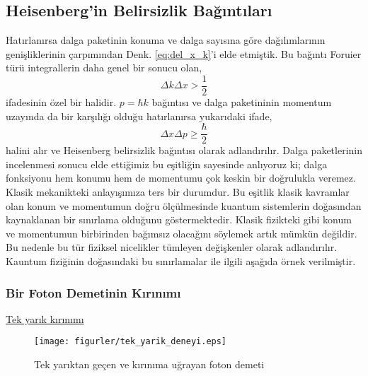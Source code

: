 \documentclass[a4paper,12pt, twoside]{article}
\begin{document}
\subsection{Heisenberg'in Belirsizlik Bağıntıları}

Hatırlanırsa dalga paketinin konuma ve dalga sayısına göre dağılımlarının genişliklerinin çarpımından Denk. \ref{eq:del_x_k}'i elde etmiştik. Bu bağıntı Foruier türü integrallerin daha genel bir sonucu olan,
\begin{equation}
\Delta k\Delta x >\dfrac {1}{2}
\end{equation}
ifadesinin özel bir halidir. $p = \hbar k$ bağıntısı ve dalga paketininin momentum uzayında da bir karşılığı olduğu hatırlanırsa yukarıdaki ifade,
\begin{equation}
\Delta x \Delta p \geq\dfrac {\hbar}{2}
\label{eq:heisenberg_uncertainty}
\end{equation}
halini alır ve Heisenberg belirsizlik bağıntısı olarak adlandırılır. Dalga paketlerinin incelenmesi sonucu elde ettiğimiz bu eşitliğin sayesinde anlıyoruz ki; dalga fonksiyonu hem konumu hem de momentumu çok keskin bir doğrulukla veremez. Klasik mekanikteki anlayışımıza ters bir durumdur. Bu eşitlik klasik kavramlar olan konum ve momentumun doğru ölçülmesinde kuantum sistemlerin doğasından kaynaklanan bir sınırlama olduğunu göstermektedir. Klasik fizikteki gibi konum ve momentumun birbirinden bağımsız olacağını söylemek artık mümkün değildir. Bu nedenle bu tür fiziksel nicelikler tümleyen değişkenler olarak adlandırılır.  Kauntum fiziğinin doğasındaki bu sınırlamalar ile ilgili aşağıda örnek verilmiştir.  

\subsubsection{Bir Foton Demetinin Kırınımı}

\href{https://opentextbc.ca/physicstestbook2/chapter/single-slit-diffraction/}{Tek yarık kırınımı}

\begin{figure}[hbtp]
	\centering
	\texttt{[image: figurler/tek\_yarik\_deneyi.eps]}
	\caption{Tek yarıktan geçen ve kırınıma uğrayan foton demeti}
	\label{fig:tekyarikdeneyi}
\end{figure}
\end{document}
